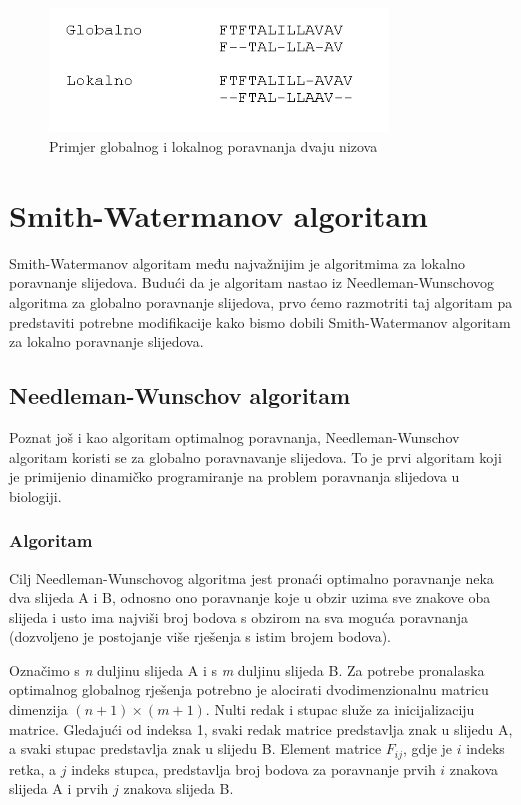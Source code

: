 \documentclass[times, utf8, zavrsni, numeric]{fer}
\begin{document}
\begin{figure}[ht!]
\centering
\includegraphics[width=90mm]{poravnanje.png}
\caption{Primjer globalnog i lokalnog poravnanja dvaju nizova}
\label{poravnanje}
\end{figure}

\chapter{Smith-Watermanov algoritam}
\indent

Smith-Watermanov algoritam\cite{swarticle} među najvažnijim je algoritmima za lokalno poravnanje slijedova. Budući da je algoritam nastao iz Needleman-Wunschovog\cite{nwarticle} algoritma za globalno poravnanje slijedova, prvo ćemo razmotriti taj algoritam pa predstaviti potrebne modifikacije kako bismo dobili Smith-Watermanov algoritam za lokalno poravnanje slijedova.

\section{Needleman-Wunschov algoritam}
\indent

Poznat još i kao algoritam optimalnog poravnanja, Needleman-Wunschov algoritam koristi se za globalno poravnavanje slijedova. To je prvi algoritam koji je primijenio dinamičko programiranje na problem poravnanja slijedova u biologiji.

\subsection{Algoritam}
\indent 

Cilj Needleman-Wunschovog algoritma jest pronaći optimalno poravnanje neka dva slijeda A i B, odnosno ono poravnanje koje u obzir uzima sve znakove oba slijeda i usto ima najviši broj bodova s obzirom na sva moguća poravnanja (dozvoljeno je postojanje više rješenja s istim brojem bodova).

Označimo s \textit{n} duljinu slijeda A i s \textit{m} duljinu slijeda B. Za potrebe pronalaska optimalnog globalnog rješenja potrebno je alocirati dvodimenzionalnu matricu dimenzija $(n + 1) \times (m + 1)$. Nulti redak i stupac služe za inicijalizaciju matrice. Gledajući od indeksa 1, svaki redak matrice predstavlja znak u slijedu A, a svaki stupac predstavlja znak u slijedu B. Element matrice $F_{ij}$, gdje je $i$ indeks retka, a $j$ indeks stupca, predstavlja broj bodova za poravnanje prvih $i$ znakova slijeda A i prvih $j$ znakova slijeda B.
\end{document}
